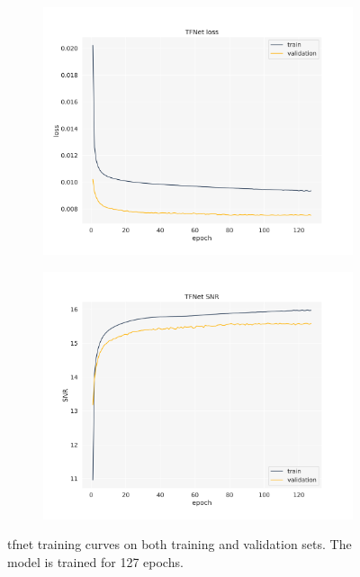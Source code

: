\begin{figure}[!htb]
	\begin{subfigure}{.5\textwidth}
		\centering
		\includegraphics[width=1.05\linewidth]{img/tfnet_loss.png}
		\label{fig:tfnet_loss}
	\end{subfigure}%
	\begin{subfigure}{.5\textwidth}
		\centering
		\includegraphics[width=1.05\linewidth]{img/tfnet_snr.png}
		\label{fig:tfnet_snr}
	\end{subfigure}%
	\caption{\gls{tfnet} training curves on both training and validation sets. The model is trained for 127 epochs.}
	\label{fig:tfnet_training_curves}
\end{figure}

